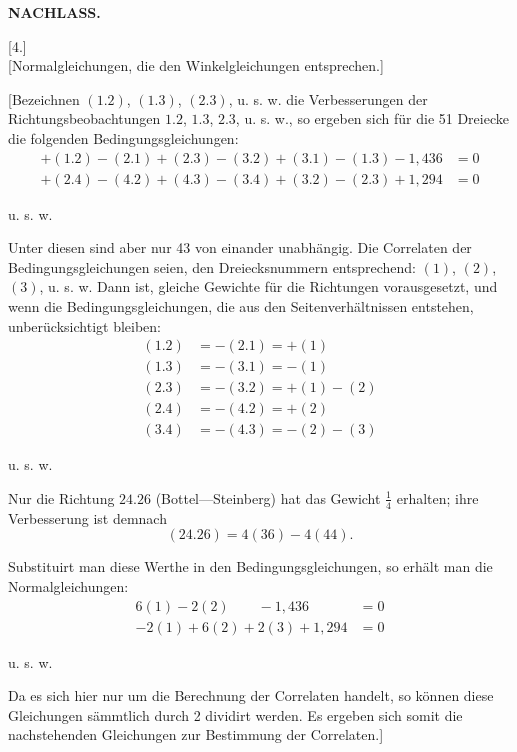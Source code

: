\hfill\textbf{NACHLASS.}
\begin{center}[4.]\\[4pt]
[Normalgleichungen, die den Winkelgleichungen entsprechen.]\end{center}

[Bezeichnen $(1.2)$, $(1.3)$, $(2.3)$, u. s. w. die Verbesserungen der Richtungsbeobachtungen
$1.2$, $1.3$, $2.3$, u. s. w., so ergeben sich für die 51 Dreiecke
die folgenden Bedingungsgleichungen:
\[
\begin{aligned}
+(1.2)-(2.1)+(2.3)-(3.2)+(3.1)-(1.3)-1{,}436&=0\\
+(2.4)-(4.2)+(4.3)-(3.4)+(3.2)-(2.3)+1{,}294&=0
\end{aligned}
\]
\begin{center}u. s. w.\end{center}

Unter diesen sind aber nur 43 von einander unabhängig. Die Correlaten
der Bedingungsgleichungen seien, den Dreiecksnummern entsprechend: $(1)$, $(2)$,
$(3)$, u. s. w. Dann ist, gleiche Gewichte für die Richtungen vorausgesetzt, und
wenn die Bedingungsgleichungen, die aus den Seitenverhältnissen entstehen,
unberücksichtigt bleiben:
\[
\begin{aligned}
(1.2)&=-(2.1)=+(1)\\
(1.3)&=-(3.1)=-(1)\\
(2.3)&=-(3.2)=+(1)-(2)\\
(2.4)&=-(4.2)=+(2)\\
(3.4)&=-(4.3)=-(2)-(3)
\end{aligned}
\]
\begin{center}u. s. w.\end{center}

Nur die Richtung $24.26$ (Bottel---Steinberg) hat das Gewicht $\frac14$ erhalten;
ihre Verbesserung ist demnach
\[
(24.26)=4(36)-4(44).
\]

Substituirt man diese Werthe in den Bedingungsgleichungen, so erhält
man die Normalgleichungen:
\[
\begin{aligned}
6(1)-2(2)\qquad-1{,}436&=0\\
-2(1)+6(2)+2(3)+1{,}294&=0
\end{aligned}
\]
\begin{center}u. s. w.\end{center}

Da es sich hier nur um die Berechnung der Correlaten handelt, so
können diese Gleichungen sämmtlich durch 2 dividirt werden. Es ergeben
sich somit die nachstehenden Gleichungen zur Bestimmung der Correlaten.]

